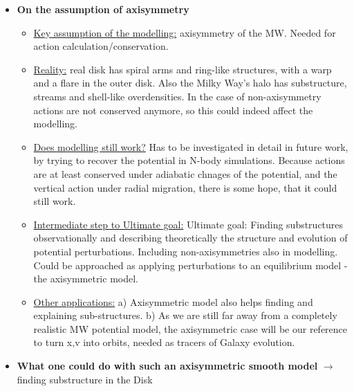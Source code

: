 \begin{itemize}
\item \textbf{On the assumption of axisymmetry} 
\begin{itemize}
\item \underline{Key assumption of the modelling:} axisymmetry of the MW. Needed for action calculation/conservation.
\item \underline{Reality:}  real disk has spiral arms and ring-like structures, with a warp and a flare in the outer disk. Also the Milky Way's halo has substructure, streams and shell-like overdensities. In the case of non-axisymmetry actions are not conserved anymore, so this could indeed affect the modelling.
\item \underline{Does modelling still work?} Has to be investigated in detail in future work, by trying to recover the potential in N-body simulations. Because actions are at least conserved under adiabatic chnages of the potential, and the vertical action under radial migration, there is some hope, that it could still work.
\item \underline{Intermediate step to Ultimate goal:} Ultimate goal: Finding substructures observationally and describing theoretically the structure and evolution of potential perturbations. Including non-axisymmetries also in modelling. Could be approached as applying perturbations to an equilibrium model - the axisymmetric model. 
\item \underline{Other applications:} a) Axisymmetric model also helps finding and explaining sub-structures.  b) As we are still far away from a completely realistic MW potential model, the axisymmetric case will be our reference to turn x,v into orbits, needed as tracers of Galaxy evolution.
\end{itemize}

\item \textbf{What one could do with such an axisymmetric smooth model} $\longrightarrow$ finding substructure in the Disk


\end{itemize}
